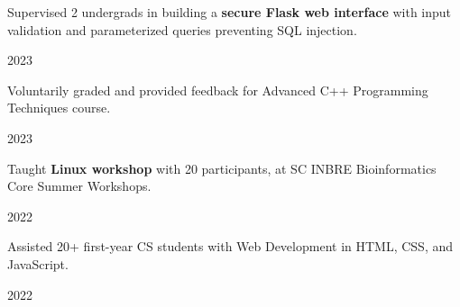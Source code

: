 
\vspace{-0.7cm}

\begin{cvleadership}
    \hspace{0cm}  %
\cvled
    {
        \begin{cvitems}
            \item {Supervised 2 undergrads in building a \textbf{secure Flask web interface} with input validation and parameterized queries preventing SQL injection.}
        \end{cvitems}
    }
    {}
    {2023} %
\cvled
    {
        \begin{cvitems}
            \item {Voluntarily graded and provided feedback for Advanced C++ Programming Techniques course.}
        \end{cvitems}
    }
    {}
    {2023} %
\cvled
    {
        \begin{cvitems}
            \item {Taught \textbf{Linux workshop} with 20 participants, at SC INBRE Bioinformatics Core Summer Workshops.}
        \end{cvitems}
    }
    {}
    {2022} %
\cvled
    {
        \begin{cvitems}
            \item {Assisted 20+ first-year CS students with Web Development in HTML, CSS, and JavaScript.}
        \end{cvitems}
    }
    {}
    {2022} %
\end{cvleadership}
% 